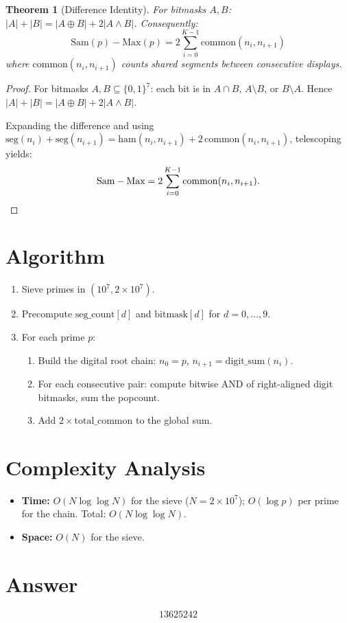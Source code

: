 \documentclass[12pt]{article}
\newtheorem{theorem}{Theorem}
\begin{document}
\begin{theorem}[Difference Identity]
For bitmasks $A, B$: $|A| + |B| = |A \oplus B| + 2|A \wedge B|$. Consequently:
\[
    \text{Sam}(p) - \text{Max}(p) = 2\sum_{i=0}^{K-1} \text{common}(n_i, n_{i+1})
\]
where $\text{common}(n_i, n_{i+1})$ counts shared segments between consecutive displays.
\end{theorem}

\begin{proof}
For bitmasks $A, B \subseteq \{0,1\}^7$: each bit is in $A \cap B$, $A \setminus B$, or $B \setminus A$. Hence $|A| + |B| = |A \oplus B| + 2|A \wedge B|$.

Expanding the difference and using $\text{seg}(n_i) + \text{seg}(n_{i+1}) = \text{ham}(n_i,n_{i+1}) + 2\,\text{common}(n_i,n_{i+1})$, telescoping yields:
\[
    \text{Sam} - \text{Max} = 2\sum_{i=0}^{K-1}\text{common}(n_i, n_{i+1}). \qedhere
\]
\end{proof}

\section{Algorithm}

\begin{enumerate}
    \item Sieve primes in $(10^7, 2\times 10^7)$.
    \item Precompute $\text{seg\_count}[d]$ and $\text{bitmask}[d]$ for $d = 0, \ldots, 9$.
    \item For each prime $p$:
    \begin{enumerate}
        \item Build the digital root chain: $n_0 = p$, $n_{i+1} = \text{digit\_sum}(n_i)$.
        \item For each consecutive pair: compute bitwise AND of right-aligned digit bitmasks, sum the popcount.
        \item Add $2 \times \text{total\_common}$ to the global sum.
    \end{enumerate}
\end{enumerate}

\section{Complexity Analysis}

\begin{itemize}
    \item \textbf{Time:} $O(N \log \log N)$ for the sieve ($N = 2 \times 10^7$); $O(\log p)$ per prime for the chain. Total: $O(N \log \log N)$.
    \item \textbf{Space:} $O(N)$ for the sieve.
\end{itemize}

\section{Answer}

\[
\boxed{13625242}
\]
\end{document}

